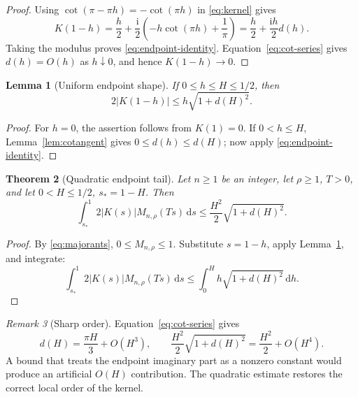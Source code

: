 \documentclass[11pt,a4paper,twoside]{article}
\newcommand{\manualtag}[1]{\tag{#1}}
\newtheorem{theorem}{Theorem}[section]
\newtheorem{lemma}[theorem]{Lemma}
\theoremstyle{remark}
\newtheorem{remark}[theorem]{Remark}
\newcommand{\iu}{\mathrm{i}}
\newcommand{\dd}{\,\mathrm{d}}
\newcommand{\abs}[1]{\lvert#1\rvert}
\begin{document}
\begin{proof}
Using \(\cot(\pi-\pi h)=-\cot(\pi h)\) in \eqref{eq:kernel} gives
\[
 K(1-h)
 =
 \frac h2+
 \frac{\iu}{2}
 \left(-h\cot(\pi h)+\frac1\pi\right)
 =
 \frac h2+\frac{\iu h}{2}d(h).
\]
Taking the modulus proves \eqref{eq:endpoint-identity}.
Equation~\eqref{eq:cot-series} gives \(d(h)=O(h)\) as \(h\downarrow0\),
and hence \(K(1-h)\to0\).
\end{proof}

\begin{lemma}[Uniform endpoint shape]\label{lem:endpoint-shape}
If \(0\le h\le H\le1/2\), then
\begin{equation}
 2\abs{K(1-h)}
 \le
 h\sqrt{1+d(H)^2}.
 \manualtag{30}\label{eq:endpoint-shape}
\end{equation}
\end{lemma}

\begin{proof}
For \(h=0\), the assertion follows from \(K(1)=0\).
If \(0<h\le H\), Lemma~\ref{lem:cotangent} gives
\(0\le d(h)\le d(H)\); now apply \eqref{eq:endpoint-identity}.
\end{proof}

\begin{theorem}[Quadratic endpoint tail]\label{thm:quadratic-tail}
Let \(n\ge1\) be an integer, let \(\rho\ge1\), \(T>0\), and let
\(0<H\le1/2\), \(s_\ast=1-H\).  Then
\begin{equation}
 \int_{s_\ast}^{1}
 2\abs{K(s)}M_{n,\rho}(Ts)\dd s
 \le
 \frac{H^2}{2}\sqrt{1+d(H)^2}.
 \manualtag{31}\label{eq:quadratic-tail}
\end{equation}
\end{theorem}

\begin{proof}
By \eqref{eq:majorants}, \(0\le M_{n,\rho}\le1\).  Substitute
\(s=1-h\), apply Lemma~\ref{lem:endpoint-shape}, and integrate:
\[
 \int_{s_\ast}^{1}
 2\abs{K(s)}M_{n,\rho}(Ts)\dd s
 \le
 \int_0^H h\sqrt{1+d(H)^2}\dd h.
\]
\end{proof}

\begin{remark}[Sharp order]\label{rem:sharp-order}
Equation~\eqref{eq:cot-series} gives
\[
 d(H)=\frac{\pi H}{3}+O(H^3),
 \qquad
 \frac{H^2}{2}\sqrt{1+d(H)^2}
 =
 \frac{H^2}{2}+O(H^4).
\]
A bound that treats the endpoint imaginary part as a nonzero constant would
produce an artificial \(O(H)\) contribution.  The quadratic estimate restores
the correct local order of the kernel.
\end{remark}
\end{document}
